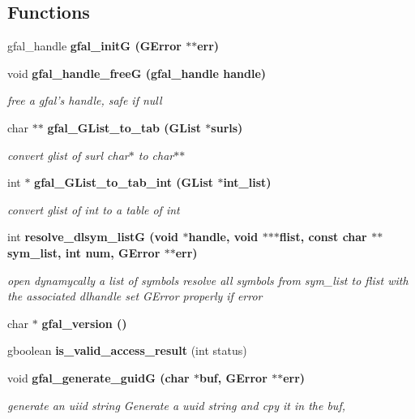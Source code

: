 \subsection*{Functions}
\begin{CompactItemize}
\item 
gfal\_\-handle \bf{gfal\_\-init\-G} (GError $\ast$$\ast$err)
\item 
void \bf{gfal\_\-handle\_\-free\-G} (gfal\_\-handle handle)\label{gfal__common__all_8c_9dbd943eaed291897d852fc3ae560058}

\begin{CompactList}\small\item\em free a gfal's handle, safe if null \item\end{CompactList}\item 
char $\ast$$\ast$ \bf{gfal\_\-GList\_\-to\_\-tab} (GList $\ast$surls)
\begin{CompactList}\small\item\em convert glist of surl char$\ast$ to char$\ast$$\ast$ \item\end{CompactList}\item 
int $\ast$ \bf{gfal\_\-GList\_\-to\_\-tab\_\-int} (GList $\ast$int\_\-list)
\begin{CompactList}\small\item\em convert glist of int to a table of int \item\end{CompactList}\item 
int \bf{resolve\_\-dlsym\_\-list\-G} (void $\ast$handle, void $\ast$$\ast$$\ast$flist, const char $\ast$$\ast$sym\_\-list, int num, GError $\ast$$\ast$err)\label{gfal__common__all_8c_0323a4ab58106e316851c1ae06148e28}

\begin{CompactList}\small\item\em open dynamycally a list of symbols resolve all symbols from sym\_\-list to flist with the associated dlhandle set GError properly if error \item\end{CompactList}\item 
char $\ast$ \bf{gfal\_\-version} ()
\item 
gboolean \textbf{is\_\-valid\_\-access\_\-result} (int status)\label{gfal__common__all_8c_aed64917ebc1c60ab8ccd2c4dfbd2c3a}

\item 
void \bf{gfal\_\-generate\_\-guid\-G} (char $\ast$buf, GError $\ast$$\ast$err)
\begin{CompactList}\small\item\em generate an uiid string Generate a uuid string and cpy it in the buf, \item\end{CompactList}\end{CompactItemize}


